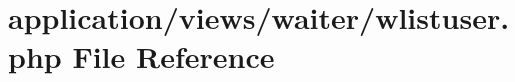 \hypertarget{wlistuser_8php}{}\section{application/views/waiter/wlistuser.php File Reference}
\label{wlistuser_8php}
